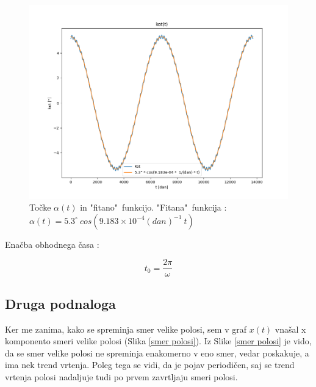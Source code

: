 \documentclass[titlepage,12pt,a4paper]{article}
\begin{document}
\begin{figure}[H]
\begin{center}
	\includegraphics[scale=0.6]{Slike/inklinacija_kot_t_fitted}
	\caption{Točke $\alpha(t)$ in "fitano"\ funkcijo. "Fitana"\ funkcija :  $\alpha(t) = 5.3^{\circ}\ cos(9.183 \times 10^{-4}(dan)^{-1}\ t)$}
	\label{alfa(t) z fitano krivuljo}
\end{center}
\end{figure}

Enačba obhodnega časa :

\begin{large}
\begin{equation}
t_0 = \frac{2\pi}{\omega}
\label{obhodni čas}
\end{equation}
\end{large}

\subsection{Druga podnaloga}
Ker me zanima, kako se spreminja smer velike polosi, sem v graf $x(t)$ vnašal x komponento smeri velike polosi (Slika \ref{smer polosi}). Iz Slike \ref{smer polosi} je vido, da se smer velike polosi ne spreminja enakomerno v eno smer, vedar poskakuje, a ima nek trend vrtenja. Poleg tega se vidi, da je pojav periodičen, saj se trend vrtenja polosi nadaljuje tudi po prvem zavrtljaju smeri polosi.
\end{document}
